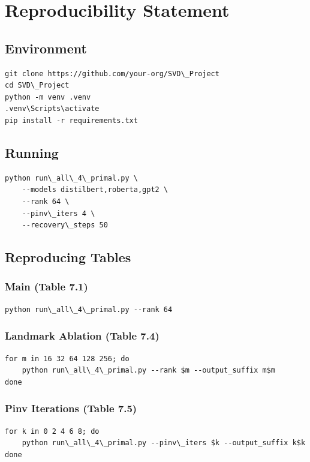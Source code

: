 
\section{Reproducibility Statement}

\subsection{Environment}

\begin{lstlisting}
git clone https://github.com/your-org/SVD\_Project
cd SVD\_Project
python -m venv .venv
.venv\Scripts\activate
pip install -r requirements.txt
\end{lstlisting}

\subsection{Running}

\begin{lstlisting}
python run\_all\_4\_primal.py \
    --models distilbert,roberta,gpt2 \
    --rank 64 \
    --pinv\_iters 4 \
    --recovery\_steps 50
\end{lstlisting}

\subsection{Reproducing Tables}

\subsubsection{Main (Table 7.1)}
\begin{lstlisting}
python run\_all\_4\_primal.py --rank 64
\end{lstlisting}

\subsubsection{Landmark Ablation (Table 7.4)}
\begin{lstlisting}
for m in 16 32 64 128 256; do
    python run\_all\_4\_primal.py --rank $m --output_suffix m$m
done
\end{lstlisting}

\subsubsection{Pinv Iterations (Table 7.5)}
\begin{lstlisting}
for k in 0 2 4 6 8; do
    python run\_all\_4\_primal.py --pinv\_iters $k --output_suffix k$k
done
\end{lstlisting}

